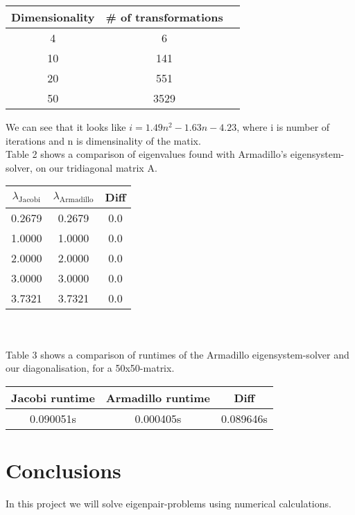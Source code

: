 \documentclass{article}
\begin{document}
	\begin{tabular}{c c c}
		Dimensionality & \# of transformations\\
		\hline
		4 & 6 \\
		10 & 141 \\
		20 & 551 \\
		50 & 3529
	\end{tabular}

	We can see that it looks like $i = 1.49n^2 - 1.63n - 4.23$, where i is number of iterations and n is dimensinality of the matix.\\

	Table 2 shows a comparison of eigenvalues found with Armadillo's eigensystem-solver, on our tridiagonal matrix A.\\
	\begin{tabular}{c c c}
		$\lambda_{\text{Jacobi}}$ & $\lambda_{\text{Armadillo}}$ & Diff\\
		\hline
		0.2679 & 0.2679 & 0.0 \\
		1.0000 & 1.0000 & 0.0 \\
		2.0000 & 2.0000 & 0.0 \\
		3.0000 & 3.0000 & 0.0 \\
		3.7321 & 3.7321 & 0.0
	\end{tabular} \\ \\

	Table 3 shows a comparison of runtimes of the Armadillo eigensystem-solver and our diagonalisation, for a 50x50-matrix.\\

	\begin{tabular}{c c c}
		Jacobi runtime & Armadillo runtime & Diff\\
		\hline
		0.090051s & 0.000405s & 0.089646s
	\end{tabular}



\section{Conclusions}
	In this project we will solve eigenpair-problems using numerical calculations.
\end{document}
